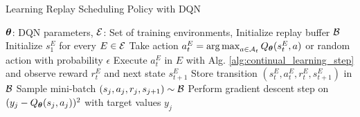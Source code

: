 
\begin{algorithm}[tb]
   \caption{Learning Replay Scheduling Policy with DQN}
   \label{alg:learning_replay_scheduling_policy_with_dqn}
\begin{algorithmic}[1]
   \Require ${\bm{\theta}}$: DQN parameters,
   \Require ${\mathcal{E}}$: Set of training environments,
   \State Initialize replay buffer ${\mathcal{B}}$
        \State Initialize $s_1^{E}$ for every $E \in {\mathcal{E}}$
            \State Take action $a_t^{E} = \operatorname*{arg\,max}_{a \in {\mathcal{A}}_t} Q_{{\bm{\theta}}}(s_t^{E}, a)$ or random action with probability $\epsilon$
            \State Execute $a_t^{E}$ in $E$ with Alg. \ref{alg:continual_learning_step} and observe reward $r_t^{E}$ and next state $s_{t+1}^{E}$ 
            \State Store transition $(s_t^{E}, a_t^{E}, r_t^{E}, s_{t+1}^{E})$ in ${\mathcal{B}}$
            \State Sample mini-batch $(s_j, a_j, r_j, s_{j+1}) \sim {\mathcal{B}}$ 
            \State Perform gradient descent step on $(y_j - Q_{{\bm{\theta}}}(s_j, a_j))^2$ with target values $y_j$ 
            \EndFor
        \EndFor 
   \EndFor
\end{algorithmic}
\end{algorithm}